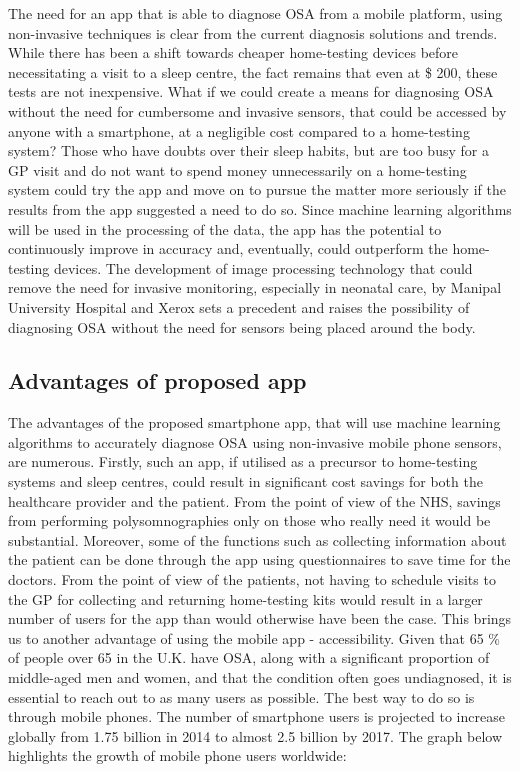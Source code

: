 The need for an app that is able to diagnose OSA from a mobile platform, using non-invasive techniques is clear from the current diagnosis solutions and trends. While there has been a shift towards cheaper home-testing devices before necessitating a visit to a sleep centre, the fact remains that even at \$ 200, these tests are not inexpensive. What if we could create a means for diagnosing OSA without the need for cumbersome and invasive sensors, that could be accessed by anyone with a smartphone, at a negligible cost compared to a home-testing system? Those who have doubts over their sleep habits, but are too busy for a GP visit and do not want to spend money unnecessarily on a home-testing system could try the app and move on to pursue the matter more seriously if the results from the app suggested a need to do so. Since machine learning algorithms will be used in the processing of the data, the app has the potential to continuously improve in accuracy and, eventually, could outperform the home-testing devices. The development of image processing technology that could remove the need for invasive monitoring, especially in neonatal care, by Manipal University Hospital and Xerox sets a precedent and raises the possibility of diagnosing OSA without the need for sensors being placed around the body.


\subsection{Advantages of proposed app}

The advantages of the proposed smartphone app, that will use machine learning algorithms to accurately diagnose OSA using non-invasive mobile phone sensors, are numerous. Firstly, such an app, if utilised as a precursor to home-testing systems and sleep centres, could result in significant cost savings for both the healthcare provider and the patient. From the point of view of the NHS, savings from performing polysomnographies only on those who really need it would be substantial. Moreover, some of the functions such as collecting information about the patient can be done through the app using questionnaires to save time for the doctors. From the point of view of the patients, not having to schedule visits to the GP for collecting and returning home-testing kits would result in a larger number of users for the app than would otherwise have been the case.
This brings us to another advantage of using the mobile app - accessibility. Given that 65 \% of people over 65 in the U.K. have OSA, along with a significant proportion of middle-aged men and women, and that the condition often goes undiagnosed, it is essential to reach out to as many users as possible. The best way to do so is through mobile phones. The number of smartphone users is projected to increase globally from 1.75 billion in 2014 to almost 2.5 billion by 2017. The graph below highlights the growth of mobile phone users worldwide:

